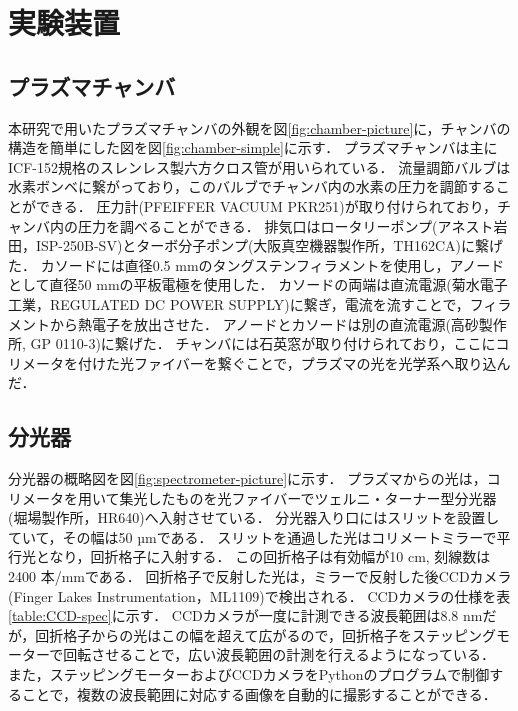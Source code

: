 \chapter{実験装置}
\section{プラズマチャンバ}
本研究で用いたプラズマチャンバの外観を図\ref{fig:chamber-picture}に，チャンバの構造を簡単にした図を図\ref{fig:chamber-simple}に示す．
プラズマチャンバは主にICF-152規格のスレンレス製六方クロス管が用いられている．
流量調節バルブは水素ボンベに繋がっており，このバルブでチャンバ内の水素の圧力を調節することができる．
圧力計(PFEIFFER VACUUM PKR251)が取り付けられており，チャンバ内の圧力を調べることができる．
排気口はロータリーポンプ(アネスト岩田，ISP-250B-SV)とターボ分子ポンプ(大阪真空機器製作所，TH162CA)に繋げた．
カソードには直径0.5 mmのタングステンフィラメントを使用し，アノードとして直径50 mmの平板電極を使用した．
カソードの両端は直流電源(菊水電子工業，REGULATED DC POWER SUPPLY)に繋ぎ，電流を流すことで，フィラメントから熱電子を放出させた．
アノードとカソードは別の直流電源(高砂製作所, GP 0110-3)に繋げた．
チャンバには石英窓が取り付けられており，ここにコリメータを付けた光ファイバーを繋ぐことで，プラズマの光を光学系へ取り込んだ．

\section{分光器}
分光器の概略図を図\ref{fig:spectrometer-picture}に示す．
プラズマからの光は，コリメータを用いて集光したものを光ファイバーでツェルニ・ターナー型分光器(堀場製作所，HR640)へ入射させている．
分光器入り口にはスリットを設置していて，その幅は50 µmである．
スリットを通過した光はコリメートミラーで平行光となり，回折格子に入射する．
この回折格子は有効幅が10 cm, 刻線数は2400 本/mmである．
回折格子で反射した光は，ミラーで反射した後CCDカメラ(Finger Lakes Instrumentation，ML1109)で検出される．
CCDカメラの仕様\cite{CCD-spec}を表\ref{table:CCD-spec}に示す．
CCDカメラが一度に計測できる波長範囲は8.8 nmだが，回折格子からの光はこの幅を超えて広がるので，回折格子をステッピングモーターで回転させることで，広い波長範囲の計測を行えるようになっている．
また，ステッピングモーターおよびCCDカメラをPythonのプログラムで制御することで，複数の波長範囲に対応する画像を自動的に撮影することができる．